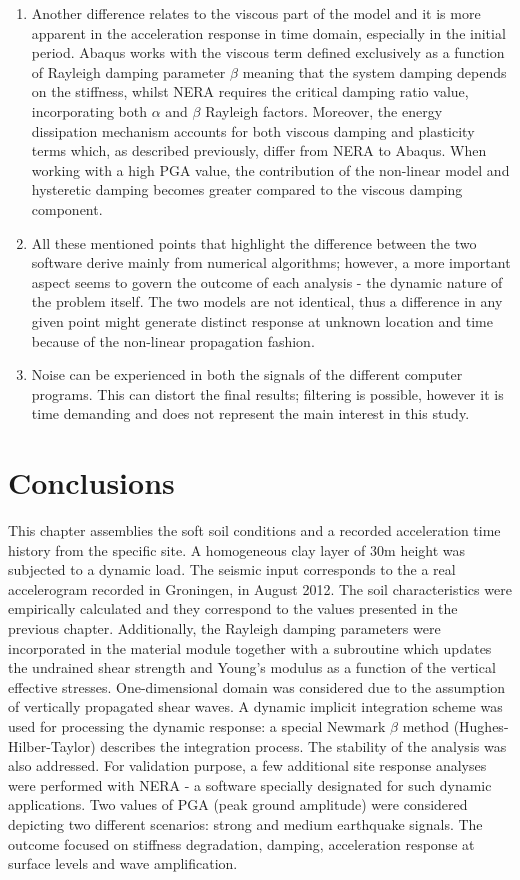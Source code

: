 \begin{enumerate}
		\item Another difference relates to the viscous part of the model and it is more apparent in the acceleration response in time domain, especially in the initial period. Abaqus works with the viscous term defined exclusively as a function of Rayleigh damping parameter $\beta$ meaning that the system damping depends on the stiffness, whilst NERA requires the critical damping ratio value, incorporating both $\alpha$ and $\beta$ Rayleigh factors. Moreover, the energy dissipation mechanism accounts for both viscous damping and plasticity terms which, as described previously, differ from NERA to Abaqus. When working with a high PGA value, the contribution of the non-linear model and hysteretic damping becomes greater compared to the viscous damping component.
		\item All these mentioned points that highlight the difference between the two software derive mainly from numerical algorithms; however, a more important aspect seems to govern the outcome of each analysis - the dynamic nature of the problem itself. The two models are not identical, thus a difference in any given point might generate distinct response at unknown location and time because of the non-linear propagation fashion. 
		\item Noise can be experienced in both the signals of the different computer programs. This can distort the final results; filtering is possible, however it is time demanding and does not represent the main interest in this study.
	\end{enumerate}
	
	
	\section{Conclusions}
	This chapter assemblies the soft soil conditions and a recorded acceleration time history from the specific site. A homogeneous clay layer of 30m height was subjected to a dynamic load. The seismic input corresponds to the a real accelerogram recorded in Groningen, in August 2012. The soil characteristics were empirically calculated and they correspond to the values presented in the previous chapter. Additionally, the Rayleigh damping parameters were incorporated in the material module together with a subroutine which updates the undrained shear strength and Young's modulus as a function of the vertical effective stresses. One-dimensional domain was considered due to the assumption of vertically propagated shear waves. A dynamic implicit integration scheme was used for processing the dynamic response: a special Newmark $\beta$ method (Hughes-Hilber-Taylor) describes the integration process. The stability of the analysis was also addressed. For validation purpose, a few additional site response analyses were performed with NERA - a software specially designated for such dynamic applications. Two values of PGA (peak ground amplitude) were considered depicting two different scenarios: strong and medium earthquake signals. The outcome focused on stiffness degradation, damping, acceleration response at surface levels and wave amplification.
	
